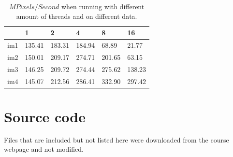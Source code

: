 \documentclass[a4paper,11pt]{article}
\begin{document}
\begin{table}[h!]
  \label{mpixelspersecond}
  \caption{$MPixels/Second$ when running with different amount of threads and on different data.}
  \begin{tabular}[h]{|l|l|l|l|l|l|}
    \hline
                  & 1     & 2     & 4     & 8     & 16\\
    \hline
    im1           & 135.41 & 183.31 & 184.94 & 68.89  & 21.77\\ 
    im2           & 150.01 & 209.17 & 274.71 & 201.65 & 63.15\\ 
    im3           & 146.25 & 209.72 & 274.44 & 275.62 & 138.23\\ 
    im4           & 145.07 & 212.56 & 286.41 & 332.90 & 297.42\\
    \hline
  \end{tabular}
\end{table}

\clearpage
\section{Source code}
Files that are included but not listed here were downloaded from the course webpage and not modified.


\clearpage


\end{document}
